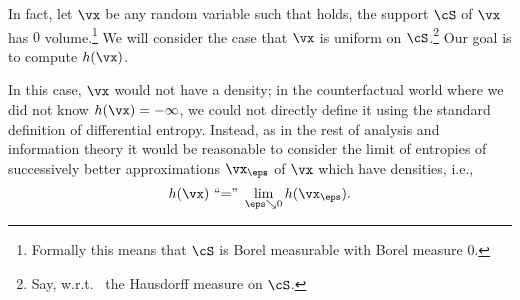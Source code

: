 \documentclass[../../book-main.tex]{subfiles}
\begin{document}
In fact, let \(\vx\) be any random variable such that  holds, the support \(\cS\) of \(\vx\) has \(0\) volume.\footnote{Formally this means that \(\cS\) is Borel measurable with Borel measure \(0\).} We will consider the case that \(\vx\) is uniform on \(\cS\).\footnote{Say, w.r.t.~ the Hausdorff measure on \(\cS\).} Our goal is to compute \(h(\vx)\).

In this case, \(\vx\) would not have a density; in the counterfactual world where we did not know \(h(\vx) = -\infty\), we could not directly define it using the standard definition of differential entropy. Instead, as in the rest of analysis and information theory it would be reasonable to consider the limit of entropies of successively better approximations \(\vx_{\eps}\) of \(\vx\) which have densities, i.e.,
\begin{equation}
    h(\vx)\ \text{``=''}\ \lim_{\eps \searrow 0}h(\vx_{\eps}).
\end{equation}
\end{document}
